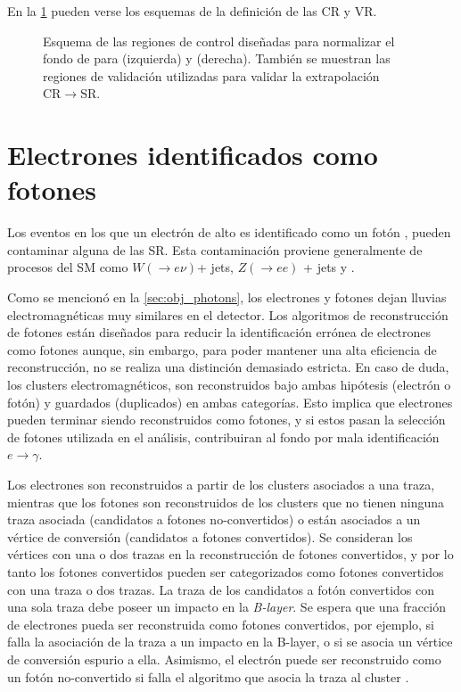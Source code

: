 En la \cref{fig:bkg_crq} pueden verse los esquemas de la definición de las CR y VR.

\begin{figure}[!htbp]
  \centering

  \resizebox{0.49\textwidth}{!}{}
  \resizebox{0.49\textwidth}{!}{}

  \caption{Esquema de las regiones de control diseñadas para normalizar el fondo
    de {\gjet} para {\SRL} (izquierda) y {\SRH} (derecha). También se muestran
    las regiones de validación utilizadas para validar la extrapolación
    $\mathrm{CR}\to\mathrm{SR}$.}
  \label{fig:bkg_crq}
\end{figure}



\section{Electrones identificados como fotones} \label{sec:efakes}

Los eventos en los que un electrón de alto {\pt} es identificado como un
fotón \cite{Bocci:1643300}, pueden contaminar alguna de las SR. Esta contaminación
proviene generalmente de procesos del SM como $W(\to e\nu)$+ jets, $Z(\to ee)$ +
jets y {\ttbar}.

Como se mencionó en la \cref{sec:obj_photons}, los electrones y fotones dejan
lluvias electromagnéticas muy similares en el detector. Los algoritmos de
reconstrucción de fotones están diseñados para reducir la identificación errónea
de electrones como fotones aunque, sin embargo, para poder mantener una alta
eficiencia de reconstrucción, no se realiza una distinción demasiado estricta. En
caso de duda, los clusters electromagnéticos, son reconstruidos bajo ambas
hipótesis (electrón o fotón) y guardados (duplicados) en ambas categorías. Esto
implica que electrones pueden terminar siendo reconstruidos como fotones, y si estos
pasan la selección de fotones utilizada en el
análisis, contribuiran al fondo por mala identificación $e\to\gamma$.

Los electrones son reconstruidos a partir de los clusters asociados a una traza, mientras
que los fotones son reconstruidos de los clusters que no tienen ninguna traza
asociada (candidatos a fotones no-convertidos) o están asociados a un vértice de
conversión (candidatos a fotones convertidos). Se consideran los vértices con
una o dos trazas en la reconstrucción de fotones convertidos, y por lo tanto los
fotones convertidos pueden ser categorizados como fotones convertidos con una
traza o dos trazas. La traza de los candidatos a fotón convertidos con una sola
traza debe poseer un impacto en la \emph{B-layer}. Se espera que una fracción de
electrones pueda ser reconstruida como fotones convertidos, por ejemplo, si
falla la asociación de la traza a un impacto en la B-layer, o si se asocia un
vértice de conversión espurio a ella. Asimismo, el electrón puede ser reconstruido como un fotón
no-convertido si falla el algoritmo que asocia
la traza al cluster .

